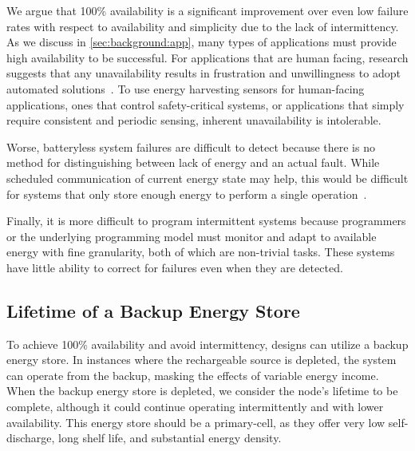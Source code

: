 We argue that 100\% availability is a significant improvement over
even low failure rates with respect to availability
and simplicity due to the lack of intermittency.
As we discuss in \cref{sec:background:app}, many types of applications 
must provide high availability to be successful.
For applications that are human facing, research suggests that any unavailability
results in frustration and %
unwillingness to adopt automated solutions~\cite{brushHome11, edwardsHome01, shehanHome07}.
To use energy harvesting sensors for human-facing applications, ones that control safety-critical systems, or applications that simply require consistent and periodic sensing, inherent unavailability is intolerable.

Worse, batteryless system failures are difficult to detect %
because there is no method for distinguishing between lack of energy
and an actual fault. While scheduled communication of current energy state
may help, this would be difficult for systems that only store enough
energy to perform a single operation~\cite{hesterFlicker17, yervaGrafting12, colinReconfigurable18,campbell2018energy}.

Finally, it is more difficult
to program intermittent systems because programmers or the underlying
programming model must monitor and adapt to available energy with fine
granularity, both of which are non-trivial tasks.
These systems have little ability to correct for failures
even when they are detected.

\subsection{Lifetime of a Backup Energy Store}
\label{sec:primary:lifetime}

To achieve 100\% availability and avoid intermittency,
designs can utilize a backup energy store.
In instances where the rechargeable source is depleted, the system
can operate from the backup, masking the effects of variable energy income.
When the backup energy store is depleted, we consider the node's lifetime
to be complete, although it could continue
operating intermittently and with lower availability. This energy store should
be a primary-cell, as they offer very low self-discharge, long shelf life, and
substantial energy density.

